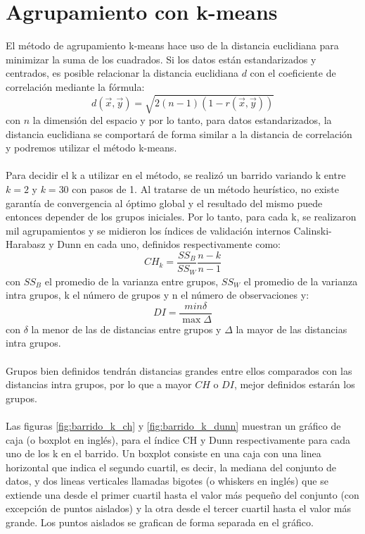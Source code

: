 \section{Agrupamiento con k-means}
El método de agrupamiento k-means hace uso de la distancia euclidiana para minimizar la suma de los cuadrados. Si los datos están estandarizados y centrados, es posible relacionar la distancia euclidiana $d$ con el coeficiente de correlación mediante la fórmula:
\begin{equation}
	d(\vec{x}, \vec{y}) = \sqrt{2(n-1)(1-r(\vec{x}, \vec{y}))}
\end{equation}
con $n$ la dimensión del espacio y por lo tanto, para datos estandarizados, la distancia euclidiana se comportará de forma similar a la distancia de correlación y podremos utilizar el método k-means.\\\\
Para decidir el k a utilizar en el método, se realizó un barrido variando k entre $k=2$ y $k=30$ con pasos de 1. Al tratarse de un método heurístico, no existe garantía de convergencia al óptimo global y el resultado del mismo puede entonces depender de los grupos iniciales. Por lo tanto, para cada k, se realizaron mil agrupamientos y se midieron los índices de validación internos Calinski-Harabasz y Dunn en cada uno, definidos respectivamente como:
\begin{equation}
	CH_k = \frac{SS_B}{SS_W}\frac{n-k}{n-1}
\end{equation}
con $SS_B$ el promedio de la varianza entre grupos, $SS_W$ el promedio de la varianza intra grupos, k el número de grupos y n el número de observaciones y:
\begin{equation}
	DI = \frac{min\delta}{\max\Delta}
\end{equation}
con $\delta$ la menor de las de distancias entre grupos y $\Delta$ la mayor de las distancias intra grupos.\\\\
Grupos bien definidos tendrán distancias grandes entre ellos comparados con las distancias intra grupos, por lo que a mayor $CH$ o $DI$, mejor definidos estarán los grupos.\\\\
Las figuras \ref{fig:barrido_k_ch} y \ref{fig:barrido_k_dunn} muestran un gráfico de caja (o boxplot en inglés), para el índice CH y Dunn respectivamente para cada uno de los k en el barrido. Un boxplot consiste en una caja con una linea horizontal que indica el segundo cuartil, es decir, la mediana del conjunto de datos, y dos lineas verticales llamadas bigotes (o whiskers en inglés) que se extiende una desde el primer cuartil hasta el valor más pequeño del conjunto (con excepción de puntos aislados) y la otra desde el tercer cuartil hasta el valor más grande. Los puntos aislados se grafican de forma separada en el gráfico.
